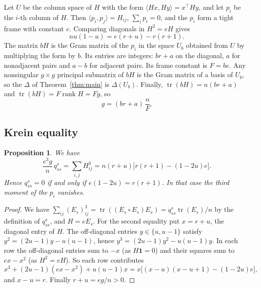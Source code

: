 \documentclass[11pt]{article}
\newtheorem{proposition}[theorem]{Proposition}
\theoremstyle{definition}
\theoremstyle{remark}
\newcommand{\ip}[2]{\langle #1,#2\rangle}
\begin{document}
Let $U$ be the column space of $H$ with the form $\ip{Hx}{Hy}=x^\top Hy$, and
let $p_i$ be the $i$-th column of $H$. Then $\ip{p_i}{p_j}=H_{ij}$, $\sum_ip_i=0$, and the $p_i$ form
a tight frame with constant $e$. Comparing diagonals in $H^2=eH$ gives
\begin{equation}\label{eq:diag}
 nu(1-u)=e(r+u)-r(r+1).
\end{equation}
The matrix $bH$ is the Gram matrix of the $p_i$ in the space $U_b$ obtained
from $U$ by multiplying the form by $b$. Its entries are integers: $br+a$ on
the diagonal, $a$ for nonadjacent pairs and $a-b$ for adjacent pairs. Its frame
constant is $F=be$. Any nonsingular $g\times g$ principal submatrix of $bH$ is
the Gram matrix of a basis of $U_b$, so the $\Delta$ of
Theorem~\ref{thm:main} is $\Delta(U_b)$. Finally,
$\operatorname{tr}(bH)=n(br+a)$ and $\operatorname{tr}(bH)=F\operatorname{rank}H=Fg$, so
\begin{equation}\label{eq:trace}
 g=(br+a)\,\frac nF .
\end{equation}

\subsection{Krein equality}

\begin{proposition}\label{prop:krein}
We have
\[
 \frac{e^3g}n\,q^s_{ss}=\sum_{i,j}H_{ij}^3=n(r+u)\bigl[r(r+1)-(1-2u)e\bigr].
\]
Hence $q^s_{ss}=0$ if and only if $e(1-2u)=r(r+1)$. In that case the third
moment of the $p_i$ vanishes.
\end{proposition}

\begin{proof}
We have
$\sum_{ij}(E_s)_{ij}^3=\operatorname{tr}((E_s\circ E_s)E_s)=q^s_{ss}\operatorname{tr}(E_s)/n$
by the definition of $q^s_{ss}$, and $H=eE_s$. For the second equality put
$x=r+u$, the diagonal entry of $H$. The off-diagonal entries $y\in\{u,u-1\}$
satisfy $y^2=(2u-1)y-u(u-1)$, hence $y^3=(2u-1)y^2-u(u-1)y$. In each row the
off-diagonal entries sum to $-x$ (as $H\mathbf 1=0$) and their squares sum to
$ex-x^2$ (as $H^2=eH$). So each row contributes
\[
 x^3+(2u-1)(ex-x^2)+u(u-1)x=x\bigl[(x-u)(x-u+1)-(1-2u)e\bigr],
\]
and $x-u=r$. Finally $r+u=eg/n>0$.
\end{proof}
\end{document}
